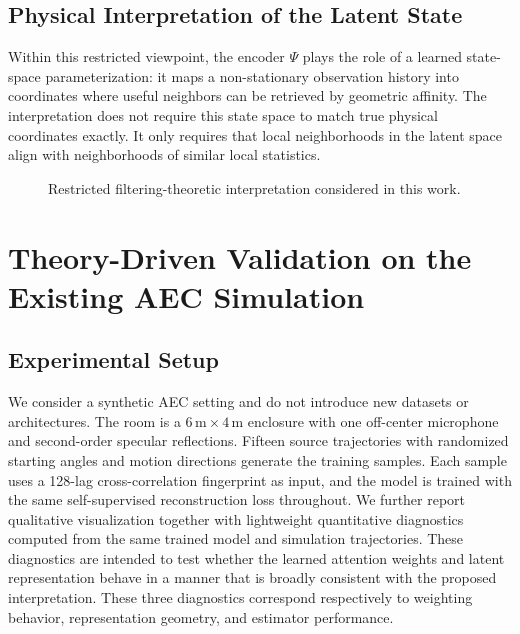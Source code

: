 \documentclass[conference]{IEEEtran}
\begin{document}
\subsection{Physical Interpretation of the Latent State}
Within this restricted viewpoint, the encoder $\Psi$ plays the role of a learned state-space parameterization: it maps a non-stationary observation history into coordinates where useful neighbors can be retrieved by geometric affinity. The interpretation does not require this state space to match true physical coordinates exactly. It only requires that local neighborhoods in the latent space align with neighborhoods of similar local statistics.

\begin{figure}[htbp]
\centering
{}
\caption{Restricted filtering-theoretic interpretation considered in this work.}
\label{fig:block}
\end{figure}

\section{Theory-Driven Validation on the Existing AEC Simulation}
\label{sec:simulation}

\subsection{Experimental Setup}
We consider a synthetic AEC setting and do not introduce new datasets or architectures. The room is a $6\,\mathrm{m}\times4\,\mathrm{m}$ enclosure with one off-center microphone and second-order specular reflections. Fifteen source trajectories with randomized starting angles and motion directions generate the training samples. Each sample uses a 128-lag cross-correlation fingerprint as input, and the model is trained with the same self-supervised reconstruction loss throughout.
We further report qualitative visualization together with lightweight quantitative diagnostics computed from the same trained model and simulation trajectories. These diagnostics are intended to test whether the learned attention weights and latent representation behave in a manner that is broadly consistent with the proposed interpretation.
These three diagnostics correspond respectively to weighting behavior, representation geometry, and estimator performance.
\end{document}
